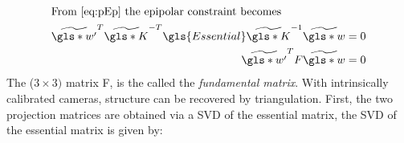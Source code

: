 \documentclass{osa-article}
\begin{document}
\begin{align}
    \intertext{From~\eqref{eq:pEp} the epipolar constraint becomes}
    \widetilde{\gls*{w'}} ^T \widetilde{\gls*{K}}^{-T} \gls{Essential} \widetilde{\gls*{K}}^{-1} \widetilde{\gls*{w}}  &= 0 \\
    \widetilde{\gls*{w'}} ^T F \widetilde{\gls*{w}}  &= 0
\end{align}
The (\(3\times3)\) matrix \gls*{F}, is the called the \emph{fundamental matrix}.
With intrinsically calibrated cameras, structure can be recovered by triangulation.
First, the two projection matrices are obtained via a SVD of the essential matrix,
the SVD of the essential matrix is given by:
\end{document}
